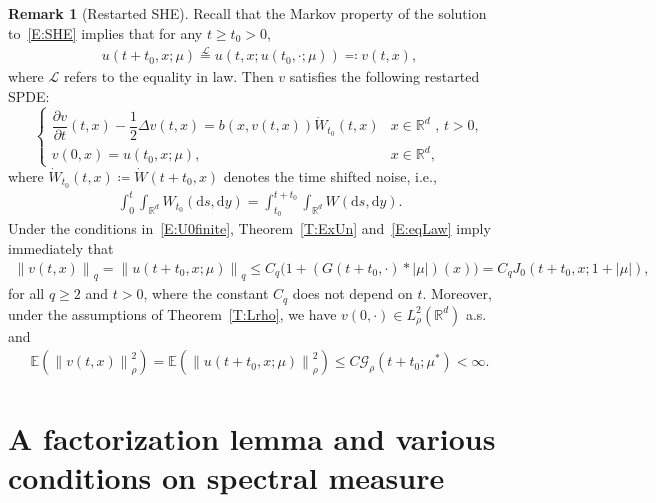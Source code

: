 \documentclass[a4paper,11pt]{article}%
\theoremstyle{plain}
\theoremstyle{definition}
\newtheorem{remark}[theorem]{Remark}
\numberwithin{equation}{section}
\newcommand{\R}{\mathbb{R}}
\newcommand{\E}{\mathbb{E}}
\newcommand{\Norm}[1]{\left\| #1 \right\|}
\newcommand{\ud}{\ensuremath{\mathrm{d}}}
\begin{document}
\begin{remark}[Restarted SHE]\label{R:Restat}
  Recall that the Markov property of the solution to~\eqref{E:SHE} implies that for any $t\ge
  t_0>0$,
  \begin{align}\label{E:eqLaw}
    u(t + t_0,x;\mu) \stackrel{\mathcal{L}}{=}
    u\left(t,x;u\left(t_0,\cdot;\mu\right)\right) \eqqcolon v(t,x),
  \end{align}
  where $\mathcal{L}$ refers to the equality in law. Then $v$ satisfies the following restarted
  SPDE:
  \begin{equation}\label{E:restart}
    \begin{cases}
      \dfrac{\partial v}{\partial t}(t,x)-\dfrac{1}{2}\Delta v(t,x) = b(x,v(t,x))\dot W_{t_0}(t,x) & \text{$x\in \R^d$ , $t>0$}, \\
      v(0,x) = u(t_0,x;\mu),                                                                       & x\in\R^d,
    \end{cases}
  \end{equation}
  where $\dot{W}_{t_0}(t,x) \coloneqq \dot{W}(t + t_0,x)$ denotes the time shifted noise, i.e.,
  \begin{align}\label{E:ShiftW}
    \int_0^t \int_{\R^d} W_{t_0}(\ud s, \ud y) = \int_{t_0}^{t+t_0} \int_{\R^d} W(\ud s, \ud y).
  \end{align}
  Under the conditions in~\eqref{E:U0finite}, Theorem~\ref{T:ExUn} and~\eqref{E:eqLaw} imply
  immediately that
  \begin{align*}
  \Norm{v(t,x)}_q = \Norm{u(t+t_0,x;\mu)}_q
                  \le C_q\bigg(1 + (G(t+t_0, \cdot)* |\mu|)(x) \bigg)
                  = C_q J_0(t+t_0,x; 1+|\mu|),
  \end{align*}
  for all $q\ge 2$ and $t>0$, where the constant $C_q$ does not depend on $t$. Moreover, under the
  assumptions of Theorem~\ref{T:Lrho}, we have $v(0,\cdot)\in L_\rho^2 (\R^d)$ a.s. and
  \begin{align*}
        \E\left(\Norm{v(t,x)}_\rho^2\right)
    = \E\left(\Norm{u(t+t_0,x;\mu)}_\rho^2\right)
    \le C \mathcal{G}_\rho(t+t_0;\mu^*)
    < \infty.
  \end{align*}
\end{remark}

\section{A factorization lemma and various conditions on spectral measure}\label{S:Factor}
\end{document}

